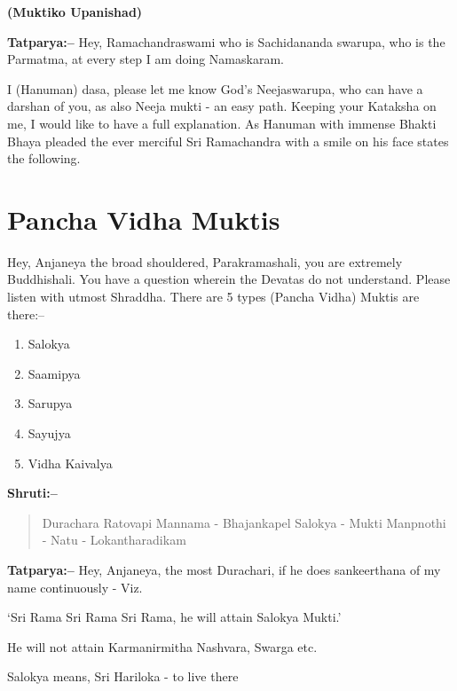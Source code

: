 \begin{flushright}
\textbf{(Muktiko Upanishad)}
\end{flushright}

\textbf{Tatparya:–} Hey, Ramachandraswami who is Sachidananda swarupa, who is the Parmatma, at every step I am doing Namaskaram.

I (Hanuman) dasa, please let me know God's Neejaswarupa, who can have a darshan of you, as also Neeja mukti - an easy path. Keeping your Kataksha on me, I would like to have a full explanation. As Hanuman with immense Bhakti Bhaya pleaded the ever merciful Sri Ramachandra with a smile on his face states the following.

\chapter{Pancha Vidha Muktis}

Hey, Anjaneya the broad shouldered, Parakramashali, you are extremely Buddhishali. You have a question wherein the Devatas do not understand. Please listen with utmost Shraddha. There are 5 types (Pancha Vidha) Muktis are there:–

\begin{enumerate}
\item Salokya

 \item Saamipya

 \item Sarupya

 \item Sayujya

 \item Vidha Kaivalya

\end{enumerate}

\textbf{Shruti:–}

\begin{verse}
Durachara Ratovapi Mannama - Bhajankapel Salokya - Mukti Manpnothi - Natu - Lokantharadikam 
\end{verse}

\textbf{Tatparya:–} Hey, Anjaneya, the most Durachari, if he does sankeerthana of my name continuously - Viz.

‘Sri Rama Sri Rama Sri Rama, he will attain Salokya Mukti.’

He will not attain Karmanirmitha Nashvara, Swarga etc.

Salokya means, Sri Hariloka - to live there

